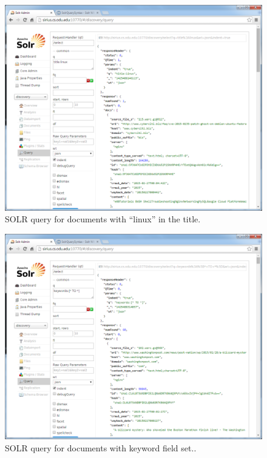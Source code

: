 \documentclass[a4paper,12pt]{article}
\begin{document}
\begin{appendices}
\begin{figure}[H]
    \centering
    \includegraphics[scale=0.5]{images/query_linux_title.png}
    \caption{SOLR query for documents with ``linux'' in the title.}
\end{figure}
\begin{figure}[H]
    \centering
    \includegraphics[scale=0.5]{images/query_keywords.png}
    \caption{SOLR query for documents with keyword field set..}
\end{figure}


\end{appendices}

\end{document}
